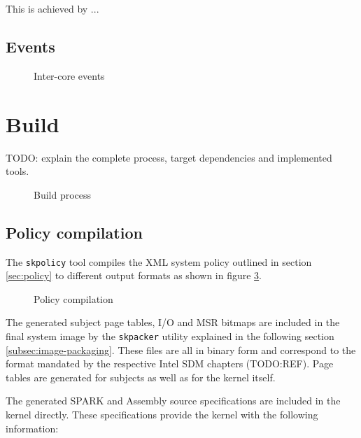 This is achieved by ...

\subsection{Events}
\begin{figure}[h]
	\centering
	
	\caption{Inter-core events}
	\label{fig:inter-core-events}
\end{figure}

\section{Build}
TODO: explain the complete process, target dependencies and implemented tools.
\begin{figure}[h]
	\centering
	
	\caption{Build process}
	\label{fig:build-process}
\end{figure}

\subsection{Policy compilation}
The \texttt{skpolicy} tool compiles the XML system policy outlined in section
\ref{sec:policy} to different output formats as shown in figure
\ref{fig:policy-compilation}.

\begin{figure}[h]
	\centering
	
	\caption{Policy compilation}
	\label{fig:policy-compilation}
\end{figure}

The generated subject page tables, I/O and MSR bitmaps are included in the final
system image by the \texttt{skpacker} utility explained in the following section
\ref{subsec:image-packaging}. These files are all in binary form and correspond
to the format mandated by the respective Intel SDM chapters (TODO:REF). Page
tables are generated for subjects as well as for the kernel itself.

The generated SPARK and Assembly source specifications are included in the
kernel directly. These specifications provide the kernel with the following
information:

